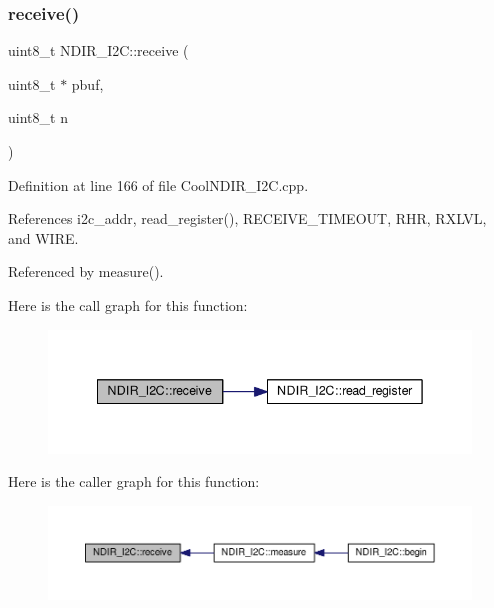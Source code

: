 \subsubsection{\texorpdfstring{receive()}{receive()}}
{\footnotesize\ttfamily uint8\+\_\+t N\+D\+I\+R\+\_\+\+I2\+C\+::receive (\begin{DoxyParamCaption}\item[{uint8\+\_\+t $\ast$}]{pbuf,  }\item[{uint8\+\_\+t}]{n }\end{DoxyParamCaption})\hspace{0.3cm}{\ttfamily [private]}}



Definition at line 166 of file Cool\+N\+D\+I\+R\+\_\+\+I2\+C.\+cpp.



References i2c\+\_\+addr, read\+\_\+register(), R\+E\+C\+E\+I\+V\+E\+\_\+\+T\+I\+M\+E\+O\+UT, R\+HR, R\+X\+L\+VL, and W\+I\+RE.



Referenced by measure().

Here is the call graph for this function\+:\nopagebreak
\begin{figure}[H]
\begin{center}
\leavevmode
\includegraphics[width=342pt]{d6/ddb/class_n_d_i_r___i2_c_aa6d2b8dd287f9c9015461cebb18f9abc_cgraph}
\end{center}
\end{figure}
Here is the caller graph for this function\+:\nopagebreak
\begin{figure}[H]
\begin{center}
\leavevmode
\includegraphics[width=350pt]{d6/ddb/class_n_d_i_r___i2_c_aa6d2b8dd287f9c9015461cebb18f9abc_icgraph}
\end{center}
\end{figure}
\mbox{\label{class_n_d_i_r___i2_c_aa72058e6e7c6174b14466fee4b2df1e0}} 
